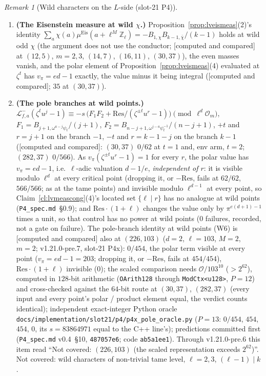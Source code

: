 \documentclass[11pt]{article}
\theoremstyle{remark}
\newtheorem{remark}[theorem]{Remark}
\newcommand{\Z}{\mathbb{Z}}
\newcommand{\PROVED}{\textsf{[proved here]}}
\newcommand{\CMPD}{\textsf{[computed and compared]}}   %
\begin{document}
\begin{remark}[Wild characters on the $L$-side (slot-21 P4)]
\begin{enumerate}
  $v_\pi(B_{r,\omega^{-r}\psi_t}/r)=-1$ exactly: at a wild point the pole of $\zeta_\ell$ is a simple $\pi$-adic denominator (\PROVED{} from $G_0(T)=\rho_\infty/T+(\Lambda)$,
  Proposition~\ref{prop:lveismeas}(4), $v(\rho_\infty)=0$ and $v_\pi(\zeta^{t}u^{r}-1)=1$; \CMPD).
\item \textbf{(The Eisenstein measure at wild $\chi$.)} Proposition~\ref{prop:lveismeas}(2)'s identity $\sum_a\chi(a)\mu^{\mathrm{Eis}}(a+\ell^{M}\Z_\ell)=-B_{1,\chi}B_{k-1,\bar\chi}/(k-1)$ holds at wild odd $\chi$
  (the argument does not use the conductor; \CMPD{} at $(12,5)$, $m=2,3$, $(14,7)$, $(16,11)$, $(30,37)$), the even masses vanish, and the polar element of Proposition~\ref{prop:lveismeas}(4) evaluated
  at $\zeta^{t}$ has $v_\pi=ed-1$ exactly, the value minus it being integral (\CMPD; $35$ at $(30,37)$).
\item \textbf{(The pole branches at wild points.)} $\mathcal L^{-}_{f,a}(\zeta^{t}u^{j}-1)\equiv-s\,\bigl(F_1F_2+\mathrm{Res}/(\zeta^{\pm t}u^{r}-1)\bigr)\pmod{\ell^{d}\mathcal O_m}$,
  $F_1=B_{j+1,\omega^{a-j}\psi_t}/(j+1)$, $F_2=B_{n-j+1,\omega^{j-a}\psi_t^{-1}}/(n-j+1)$, $+t$ and $r=j+1$ on the branch $-1$, $-t$ and $r=k-1-j$ on the branch $k-1$ (\CMPD: $(30,37)$ $0/62$ at $t=1$
  and, env arm, $t=2$; $(282,37)$ $0/566$). As $v_\pi(\zeta^{\pm t}u^{r}-1)=1$ for every $r$, the polar value has $v_\pi=ed-1$, i.e.\ $\ell$-adic valuation $d-1/e$, \emph{independent of $r$}: it is visible modulo $\ell^{d}$ at every critical
  point (dropping it, or $-\mathrm{Res}$, fails at $62/62$, $566/566$; as at the tame points) and invisible modulo $\ell^{d-1}$ at every point, so Claim~\ref{cl:lvmeascong}(4)'s located set
  $\{\ell\mid r\}$ has no analogue at wild points (\texttt{P4\_spec.md}~\S0.9); and $\mathrm{Res}\cdot(1+\ell)$ changes the value only by
  $\pi^{e(d+1)-1}$ times a unit, so that control has no power at wild points ($0$ failures, recorded, not a gate on failure). The pole-branch identity at wild points (W6) is \CMPD{} also at
  $(226,103)$ ($d=2$, $\ell=103$, $M=2$, $m=2$; v1.21.0-pre.7, slot-21 P4x): $0/454$, the polar term visible at every point ($v_\pi=ed-1=203$; dropping it, or $-\mathrm{Res}$, fails at $454/454$),
  $\mathrm{Res}\cdot(1+\ell)$ invisible ($0$); the scaled comparison needs $\mathcal O/103^{10}$ ($>2^{62}$), computed in $128$-bit arithmetic (\texttt{OArith128} through \texttt{ModCtx<u128>}, $P=12$) and
  cross-checked against the $64$-bit route at $(30,37)$, $(282,37)$ (every input and every point's polar / product element equal, the verdict counts identical); independent exact-integer Python
  oracle \texttt{docs/implementation/slot21/p4/p4x\_pole\_oracle.py} ($P=13$: $0/454$, $454$, $454$, $0$, its $s=83864971$ equal to the C++ line's); predictions committed first
  (\texttt{P4\_spec.md} v0.4~\S10, \texttt{487057e6}; code \texttt{ab5a1ee1}). Through v1.21.0-pre.6 this item read ``Not covered: $(226,103)$ (the scaled representation exceeds $2^{62}$)''.
  Not covered: wild characters of non-trivial tame level, $\ell=2,3$, $(\ell-1)\mid k$.
\end{enumerate}
\end{remark}
\end{document}
